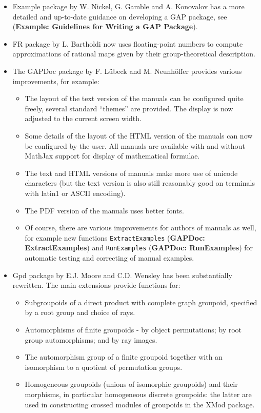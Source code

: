 \documentclass[a4paper,11pt]{report}
\begin{document}
{{{\begin{itemize}
\item  \textsf{Example} package by W. Nickel, G. Gamble and A. Konovalov has a more detailed and
up-to-date guidance on developing a \textsf{GAP} package, see  (\textbf{Example: Guidelines for Writing a GAP Package}). 
\item  \textsf{FR} package by L. Bartholdi now uses floating-point numbers to compute
approximations of rational maps given by their group-theoretical description. 
\item  The \textsf{GAPDoc} package by F. L{\"u}beck and M. Neunh{\"o}ffer provides various improvements,
for example: 
\begin{itemize}
\item  The layout of the text version of the manuals can be configured quite freely,
several standard ``themes'' are provided. The display is now adjusted to the current screen width. 
\item  Some details of the layout of the HTML version of the manuals can now be
configured by the user. All manuals are available with and without MathJax
support for display of mathematical formulae. 
\item  The text and HTML versions of manuals make more use of unicode characters (but
the text version is also still reasonably good on terminals with latin1 or
ASCII encoding). 
\item  The PDF version of the manuals uses better fonts. 
\item  Of course, there are various improvements for authors of manuals as well, for
example new functions \texttt{ExtractExamples} (\textbf{GAPDoc: ExtractExamples}) and \texttt{RunExamples} (\textbf{GAPDoc: RunExamples}) for automatic testing and correcting of manual examples. 
\end{itemize}
 
\item  \textsf{Gpd} package by E.J. Moore and C.D. Wensley has been substantially rewritten. The
main extensions provide functions for: 
\begin{itemize}
\item  Subgroupoids of a direct product with complete graph groupoid, specified by a
root group and choice of rays. 
\item  Automorphisms of finite groupoids - by object permutations; by root group
automorphisms; and by ray images. 
\item  The automorphism group of a finite groupoid together with an isomorphism to a
quotient of permutation groups. 
\item  Homogeneous groupoids (unions of isomorphic groupoids) and their morphisms, in
particular homogeneous discrete groupoids: the latter are used in constructing
crossed modules of groupoids in the \textsf{XMod} package. 
\end{itemize}
 

\end{itemize}}}}
\end{document}
